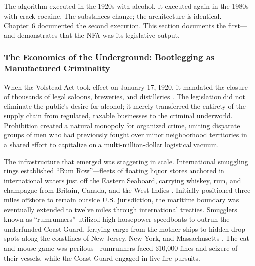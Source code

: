 \documentclass[12pt,openany]{book}
\begin{document}
The algorithm executed in the 1920s with alcohol. It executed again in the 1980s with crack cocaine. The substances change; the architecture is identical. Chapter~6 documented the second execution. This section documents the first---and demonstrates that the NFA was its legislative output.

\subsubsection{The Economics of the Underground: Bootlegging as Manufactured Criminality}

When the Volstead Act took effect on January 17, 1920, it mandated the closure of thousands of legal saloons, breweries, and distilleries \cite{archives_smugglers}. The legislation did not eliminate the public's desire for alcohol; it merely transferred the entirety of the supply chain from regulated, taxable businesses to the criminal underworld. Prohibition created a natural monopoly for organized crime, uniting disparate groups of men who had previously fought over minor neighborhood territories in a shared effort to capitalize on a multi-million-dollar logistical vacuum.

The infrastructure that emerged was staggering in scale. International smuggling rings established ``Rum Row''---fleets of floating liquor stores anchored in international waters just off the Eastern Seaboard, carrying whiskey, rum, and champagne from Britain, Canada, and the West Indies \cite{archives_smugglers, coastguard_rumrow}. Initially positioned three miles offshore to remain outside U.S. jurisdiction, the maritime boundary was eventually extended to twelve miles through international treaties. Smugglers known as ``rumrunners'' utilized high-horsepower speedboats to outrun the underfunded Coast Guard, ferrying cargo from the mother ships to hidden drop spots along the coastlines of New Jersey, New York, and Massachusetts \cite{capecod_rumrunners, ipswich_rumrunners}. The cat-and-mouse game was perilous---rumrunners faced \$10,000 fines and seizure of their vessels, while the Coast Guard engaged in live-fire pursuits.
\end{document}
